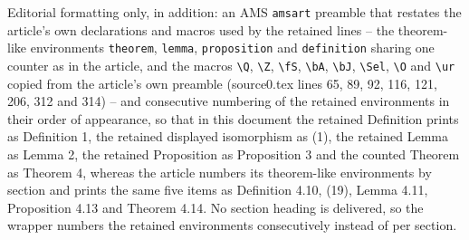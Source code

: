 \documentclass[10pt,a4paper]{amsart}
\begin{document}
Editorial formatting only, in addition: an AMS \texttt{amsart} preamble that restates the article's own declarations and macros used by the retained lines -- the theorem-like environments \texttt{theorem}, \texttt{lemma}, \texttt{proposition} and \texttt{definition} sharing one counter as in the article, and the macros \texttt{\textbackslash Q}, \texttt{\textbackslash Z}, \texttt{\textbackslash fS}, \texttt{\textbackslash bA}, \texttt{\textbackslash bJ}, \texttt{\textbackslash Sel}, \texttt{\textbackslash O} and \texttt{\textbackslash ur} copied from the article's own preamble (source0.tex lines 65, 89, 92, 116, 121, 206, 312 and 314) -- and consecutive numbering of the retained environments in their order of appearance, so that in this document the retained Definition prints as Definition 1, the retained displayed isomorphism as (1), the retained Lemma as Lemma 2, the retained Proposition as Proposition 3 and the counted Theorem as Theorem 4, whereas the article numbers its theorem-like environments by section and prints the same five items as Definition 4.10, (19), Lemma 4.11, Proposition 4.13 and Theorem 4.14. No section heading is delivered, so the wrapper numbers the retained environments consecutively instead of per section.
\end{document}
